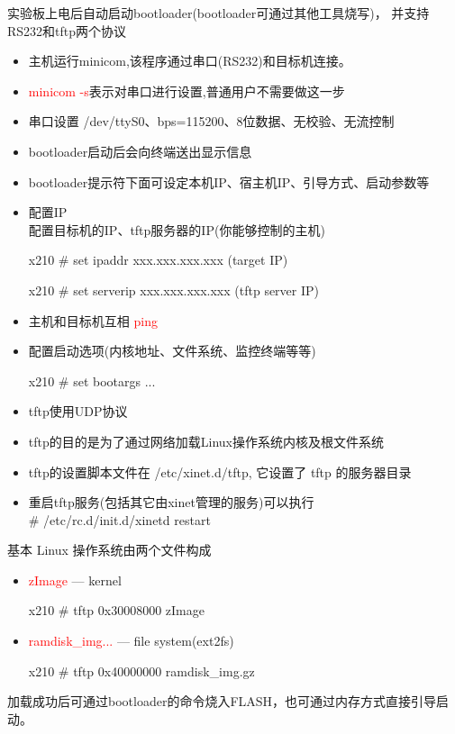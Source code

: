 实验板上电后自动启动bootloader(bootloader可通过其他工具烧写)，
并支持RS232和tftp两个协议
\begin{itemize}
  \item 主机运行minicom,该程序通过串口(RS232)和目标机连接。
  \item \textcolor{red}{minicom -s}表示对串口进行设置,普通用户不需要做这一步
  \item 串口设置 /dev/ttyS0、bps=115200、8位数据、无校验、无流控制
  \item bootloader启动后会向终端送出显示信息
  \item bootloader提示符下面可设定本机IP、宿主机IP、引导方式、启动参数等
\end{itemize}
\endslide

\begin{itemize}
  \item 配置IP\\
        配置目标机的IP、tftp服务器的IP(你能够控制的主机)

      x210 \# set ipaddr xxx.xxx.xxx.xxx (target IP)

      x210 \# set serverip xxx.xxx.xxx.xxx (tftp server IP)
  \item 主机和目标机互相 \textcolor{red}{ping}
  \item 配置启动选项(内核地址、文件系统、监控终端等等)

      x210 \# set bootargs ...
\end{itemize}
\endslide

\begin{itemize}
  \item tftp使用UDP协议
  \item tftp的目的是为了通过网络加载Linux操作系统内核及根文件系统
  \item tftp的设置脚本文件在 /etc/xinet.d/tftp, 它设置了 tftp 的服务器目录
  \item 重启tftp服务(包括其它由xinet管理的服务)可以执行\\
        \# /etc/rc.d/init.d/xinetd restart
\end{itemize}
\endslide

基本 Linux 操作系统由两个文件构成
\begin{itemize}
  \item \textcolor{red}{zImage} --- kernel

      x210 \# tftp 0x30008000 zImage
  \item \textcolor{red}{ramdisk\_img...}  --- file system(ext2fs)

      x210 \# tftp 0x40000000 ramdisk\_img.gz
\end{itemize}
加载成功后可通过bootloader的命令烧入FLASH，也可通过内存方式直接引导启动。

